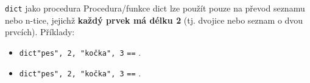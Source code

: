 \begin{frame}{\texttt{dict} jako procedura}
 Procedura/funkce \alert{dict} lze použít pouze na převod seznamu nebo n-tice,
 jejichž \textbf{každý prvek má délku 2} (tj. dvojice nebo seznam o dvou
 prvcích). Příklady:
 \begin{itemize}
  \item \texttt{dict\mlb{(}\mlg{[}\mdb{(}"pes", 2\mdb{)}, \mdb{(}"kočka",
   3\mdb{)}\mlg{]}\mlb{)}} \texttt{==} \texttt{}.
  \item \texttt{dict\mlb{(}\mlg{(}\mdb{[}"pes", 2\mdb{]}, \mdb{[}"kočka",
   3\mdb{]}\mlg{)}\mlb{)}} \texttt{==} \texttt{}.
 \end{itemize}
\end{frame}

